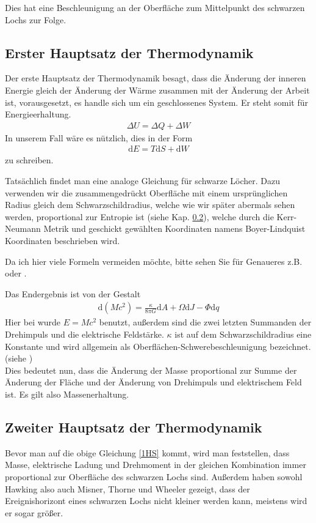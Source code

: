 \documentclass[ngerman]{scrartcl}
\newcommand{\diff}{\mathrm{d}}
\begin{document}
	Dies hat eine Beschleunigung an der Oberfläche zum Mittelpunkt des schwarzen Lochs zur Folge. 

	\subsection{Erster Hauptsatz der Thermodynamik}
	Der erste Hauptsatz der Thermodynamik besagt, dass die Änderung der inneren Energie gleich der Änderung der Wärme zusammen mit der Änderung der Arbeit ist, vorausgesetzt, es handle sich um ein geschlossenes System. Er steht somit für Energieerhaltung.
		\begin{align}
			\Delta U = \Delta Q + \Delta W
		\end{align}
	In unserem Fall wäre es nützlich, dies in der Form
		\begin{align}
			\diff E = T\diff S + \diff W
		\end{align}
	zu schreiben. 
	
	Tatsächlich findet man eine analoge Gleichung für schwarze Löcher.
	Dazu verwenden wir die zusammengedrückt Oberfläche mit einem ursprünglichen Radius gleich dem Schwarzschildradius, welche wie wir später abermals sehen werden, proportional zur Entropie ist (siehe Kap. \ref{zweiterHS}), welche durch die Kerr-Neumann Metrik und geschickt gewählten Koordinaten namens Boyer-Lindquist Koordinaten beschrieben wird. 
	
	Da ich hier viele Formeln vermeiden möchte, bitte sehen Sie für Genaueres z.B. \cite{BekensteinHawking} oder \cite{Gebhardt}.
	
	Das Endergebnis ist von der Gestalt
		\begin{align} \label{1HS}
			\diff (Mc^2) = \frac{\kappa}{8 \pi G} \diff A + \Omega \diff J - \Phi \diff q
		\end{align} 
	Hier bei wurde $E = Mc^2$ benutzt, außerdem sind die zwei letzten Summanden der Drehimpuls und die elektrische Feldstärke. $\kappa$ ist auf dem Schwarzschildradius eine Konstante und wird allgemein als Oberflächen-Schwerebeschleunigung bezeichnet. (siehe \cite{Gebhardt})
	\\
	
	Dies bedeutet nun, dass die Änderung der Masse proportional zur Summe der Änderung der Fläche und der Änderung von Drehimpuls und elektrischem Feld ist. Es gilt also Massenerhaltung. 

\subsection{Zweiter Hauptsatz der Thermodynamik} \label{zweiterHS}
	Bevor man auf die obige Gleichung \ref{1HS} kommt, wird man feststellen, dass Masse, elektrische Ladung und Drehmoment in der gleichen Kombination immer proportional zur Oberfläche des schwarzen Lochs sind. 
	Außerdem haben sowohl Hawking \cite{ParticleCreation} also auch Misner, Thorne und Wheeler \cite{MisnerThorneWheeler} gezeigt, dass der Ereignishorizont eines schwarzen Lochs nicht kleiner werden kann, meistens wird er sogar größer. 
	
\end{document}
